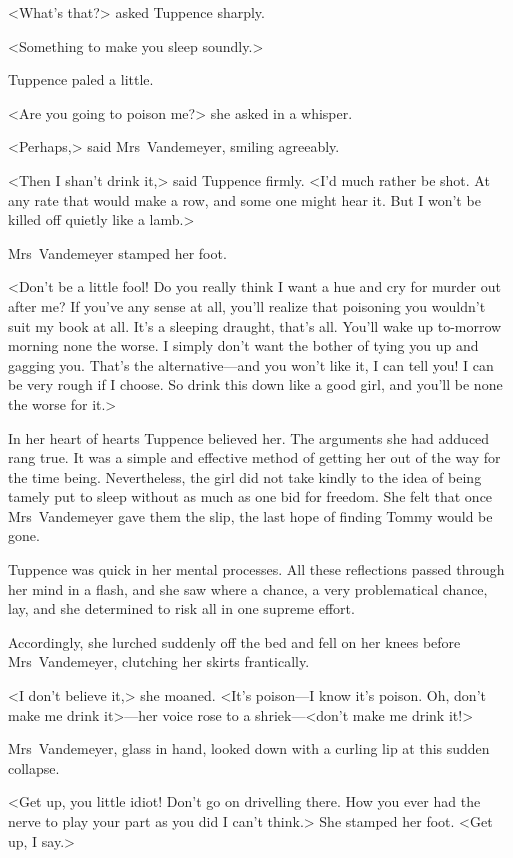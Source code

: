 <What's that?> asked Tuppence sharply.

<Something to make you sleep soundly.>

Tuppence paled a little.

<Are you going to poison me?> she asked in a whisper.

<Perhaps,> said Mrs~Vandemeyer, smiling agreeably.

<Then I shan't drink it,> said Tuppence firmly. <I'd much rather be shot. At any rate that would make a row, and some one might hear it. But I won't be killed off quietly like a lamb.>

Mrs~Vandemeyer stamped her foot.

<Don't be a little fool! Do you really think I want a hue and cry for murder out after me? If you've any sense at all, you'll realize that poisoning you wouldn't suit my book at all. It's a sleeping draught, that's all. You'll wake up to-morrow morning none the worse. I simply don't want the bother of tying you up and gagging you. That's the alternative—and you won't like it, I can tell you! I can be very rough if I choose. So drink this down like a good girl, and you'll be none the worse for it.>

In her heart of hearts Tuppence believed her. The arguments she had adduced rang true. It was a simple and effective method of getting her out of the way for the time being. Nevertheless, the girl did not take kindly to the idea of being tamely put to sleep without as much as one bid for freedom. She felt that once Mrs~Vandemeyer gave them the slip, the last hope of finding Tommy would be gone.

Tuppence was quick in her mental processes. All these reflections passed through her mind in a flash, and she saw where a chance, a very problematical chance, lay, and she determined to risk all in one supreme effort.

Accordingly, she lurched suddenly off the bed and fell on her knees before Mrs~Vandemeyer, clutching her skirts frantically.

<I don't believe it,> she moaned. <It's poison—I know it's poison. Oh, don't make me drink it>—her voice rose to a shriek—<don't make me drink it!>

Mrs~Vandemeyer, glass in hand, looked down with a curling lip at this sudden collapse.

<Get up, you little idiot! Don't go on drivelling there. How you ever had the nerve to play your part as you did I can't think.> She stamped her foot. <Get up, I say.>

